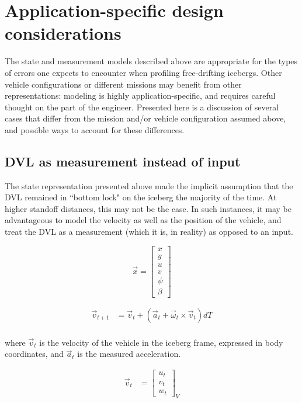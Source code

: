 \section{Application-specific design considerations}

The state and measurement models described above are appropriate for the types of errors one expects to encounter when profiling free-drifting icebergs. Other vehicle configurations or different missions may benefit from other representations: modeling is highly application-specific, and requires careful thought on the part of the engineer. Presented here is a discussion of several cases that differ from the mission and/or vehicle configuration assumed above, and possible ways to account for these differences.

\subsection{DVL as measurement instead of input}
\label{sec.VelocityState}
The state representation presented above made the implicit assumption that the DVL remained in ``bottom lock" on the iceberg the majority of the time. At higher standoff distances, this may not be the case. In such instances, it may be advantageous to model the velocity as well as the position of the vehicle, and treat the DVL as a measurement (which it is, in reality) as opposed to an input.

\begin{equation}
\label{eq.altState}
\vec{x}= \left[\begin{array}{c}
                     x \\ y \\ u \\ v \\ \psi \\ \beta 
                     \end{array}\right]
\end{equation}

\begin{align}
\vec{v}_{t+1} &= \vec{v}_t + \left( \vec{a}_t + \vec{\omega}_t \times \vec{v}_t \right)dT\\
\end{align}

where $\vec{v}_t$ is the velocity of the vehicle in the iceberg frame, expressed in body coordinates, and $\vec{a}_t$ is the measured acceleration.
 
\begin{align}
\vec{v}_{t} &=  \left[\begin{array}{c}
                     u_t \\ v_t \\ w_t
                     \end{array}\right]_V
\end{align}

